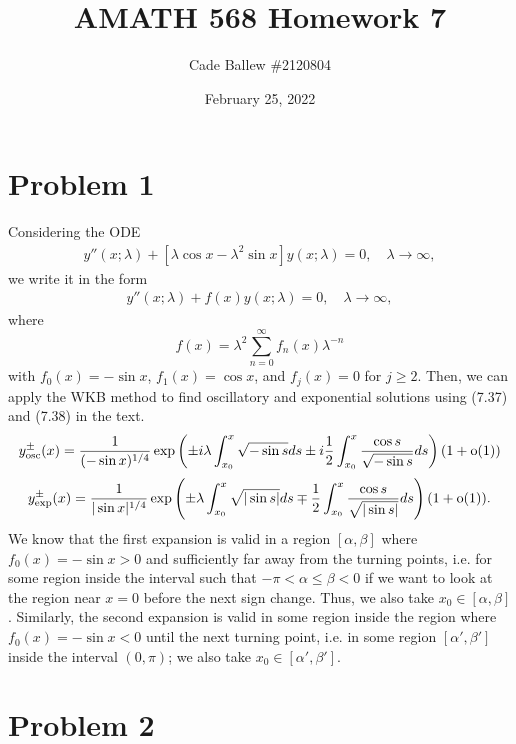 \documentclass{article}
\title{AMATH 568 Homework 7}
\author{Cade Ballew \#2120804}
\date{February 25, 2022}
\begin{document}
	
\maketitle
	
\section{Problem 1}
Considering the ODE
  \begin{align*}  
    y''(x;\lambda) + \left[ \lambda \cos x - \lambda^2 \sin x \right] y(x;\lambda) = 0, \quad \lambda \to \infty,
  \end{align*}
we write it in the form 
  \begin{align*}  
    y''(x;\lambda) + f(x) y(x;\lambda) = 0, \quad \lambda \to \infty,
  \end{align*}
where 
\[
f(x)=\lambda^2\sum_{n=0}^\infty f_n(x)\lambda^{-n}
\]
with $f_0(x)=-\sin x$, $f_1(x)=\cos{x}$, and $f_j(x)=0$ for $j\geq2$. Then, we can apply the WKB method to find oscillatory and exponential solutions using (7.37) and (7.38) in the text. 
\begin{align*}
y_{\text{osc}}^\pm(x)=\frac{1}{(-\sin x)^{1/4}}\exp\left(\pm i\lambda\int_{x_0}^x\sqrt{-\sin{s}}ds\pm i\frac{1}{2}\int_{x_0}^x\frac{\cos{s}}{\sqrt{-\sin{s}}}ds\right)(1+\operatorname{o}(1))
\end{align*}
\begin{align*}
y_{\text{exp}}^\pm(x)=\frac{1}{|\sin{x}|^{1/4}}\exp\left(\pm\lambda\int_{x_0}^x\sqrt{|\sin s|}ds\mp\frac{1}{2}\int_{x_0}^x\frac{\cos{s}}{\sqrt{|\sin{s}|}}ds\right)(1+\operatorname{o}(1)).
\end{align*}
We know that the first expansion is valid in a region $[\alpha,\beta]$ where $f_0(x)=-\sin{x}>0$ and sufficiently far away from the turning points, i.e. for some region inside the interval such that $-\pi<\alpha\leq\beta<0$ if we want to look at the region near $x=0$ before the next sign change. Thus, we also take $x_0\in[\alpha,\beta]$. Similarly, the second expansion is valid in some region inside the region where $f_0(x)=-\sin{x}<0$ until the next turning point, i.e. in some region $[\alpha',\beta']$ inside the interval $(0,\pi)$; we also take $x_0\in[\alpha',\beta']$.

\section{Problem 2}
\end{document}
